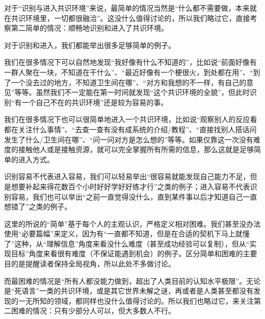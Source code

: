 对于“识别与进入共识环境”来说，最简单的情况当然是“什么都不需要做，本来就在共识环境里，一切都很融洽”。这没什么值得讨论的，所以我们略过它，直接考察第二简单的情况：顺畅地识别和进入了共识环境。
\begin{explain}
对于识别和进入，我们都能举出很多足够简单的例子。

我们在很多情况下可以自然地发现“我好像有什么不知道的”，比如说“前面好像有一群人聚在一块，不知道在干什么”、“最近好像有一个梗很火，到处都在用”、“到了一个没去过的地方，不知道卫生间在哪”、“对方和我想的不一样，有自己的意见”等等。虽然我们不一定能在第一时间就发现“这个共识环境的全貌”，但此时识别“有一个自己不在的共识环境”还是较为容易的事。

我们在很多情况下也可以很简单地进入一个共识环境，比如说“观察别人的反应看都在关注什么事情”、“去查一查有没有成系统的介绍/教程”、“直接找别人搭话问发生了什么/卫生间在哪”、“问一问对方是怎么想的”等等。如果仅靠这一次没有难度的接触他人或是接触资源，就可以完全掌握所有所需的信息，那么这就是足够简单的进入方式。

识别容易不代表进入容易，我们可以轻易举出“很容易就能发现自己能力不足，但是想要补起来得花数百个小时好好学好好练才行”之类的例子；进入容易不代表识别容易，我们也可以举出“之前一直觉得没什么，直到某件事以后才知道自己一直想错了”之类的例子。

这里的所说的“简单”基于每个人的主观认识，严格定义相对困难。我们甚至没办法使用“必要篇幅”来定义，因为有“一直都不知道，但是在合适的契机下马上就懂了”这种，从“理解信息”角度来看没什么难度（甚至成功经验可以复制），但从“实现目标”角度来看很有难度（不保证能遇到机会）的例子。区分简单和困难的主要目的是提醒读者保持全局视角，所以此处不多做讨论。
\end{explain}
而最困难的情况是“所有人都没能力做到，超出了人类目前的认知水平极限”。无论是“死语言”一类的共识环境，或是其它世界未解之谜，再或者是人类甚至都没有发现的一无所知的领域，都同样也没什么值得讨论的。所以我们也略过它，来关注第二困难的情况：只有少部分人可以，但大多数人不行。
